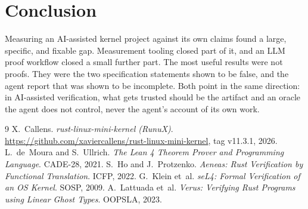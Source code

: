 \documentclass[sigconf,nonacm]{acmart}
\begin{document}
\section{Conclusion}
Measuring an AI-assisted kernel project against its own claims found a large, specific, and fixable gap. Measurement tooling closed part of it, and an LLM proof workflow closed a small further part. The most useful results were not proofs. They were the two specification statements shown to be false, and the agent report that was shown to be incomplete. Both point in the same direction: in AI-assisted verification, what gets trusted should be the artifact and an oracle the agent does not control, never the agent's account of its own work.

\begin{thebibliography}{9}
 X.~Callens. \emph{rust-linux-mini-kernel (RunuX)}. \url{https://github.com/xaviercallens/rust-linux-mini-kernel}, tag v11.3.1, 2026.
 L.~de~Moura and S.~Ullrich. \emph{The Lean 4 Theorem Prover and Programming Language}. CADE-28, 2021.
 S.~Ho and J.~Protzenko. \emph{Aeneas: Rust Verification by Functional Translation}. ICFP, 2022.
 G.~Klein et~al. \emph{seL4: Formal Verification of an OS Kernel}. SOSP, 2009.
 A.~Lattuada et~al. \emph{Verus: Verifying Rust Programs using Linear Ghost Types}. OOPSLA, 2023.
\end{thebibliography}
\end{document}

